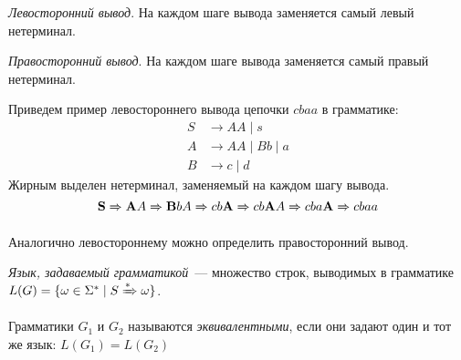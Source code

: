 \begin{definition}
    \emph{Левосторонний вывод}. На каждом шаге вывода заменяется самый левый нетерминал.
\end{definition}

\begin{definition}
    \emph{Правосторонний вывод}. На каждом шаге вывода заменяется самый правый нетерминал.
\end{definition}

\begin{example}
    Приведем пример левостороннего вывода цепочки $cbaa$ в грамматике:
    \begin{align*}
        S & \rightarrow A A \mid s          \\
        A & \rightarrow A A \mid B b \mid a \\
        B & \rightarrow c \mid d
    \end{align*}
    Жирным выделен нетерминал, заменяемый на каждом шагу вывода.
    \[ \mathbf{S} \derives[] \mathbf{A} A \derives[] \mathbf{B} b A \derives[] c b \mathbf{A} \derives[] c b \mathbf{A} A \derives[] c b a \mathbf{A} \derives[] c b a a \]
\end{example}

Аналогично левостороннему можно определить правосторонний вывод.

\begin{definition}[Язык]
    \emph{Язык, задаваемый грамматикой}~--- множество строк, выводимых в грамматике $L(G) = \{ \omega \in \Sigma^* \mid S \derives \omega \}$.
\end{definition}

\begin{definition}
    Грамматики $G_1$ и $G_2$ называются \emph{эквивалентными}, если они задают один и тот же язык: $L(G_1) = L(G_2)$
\end{definition}

